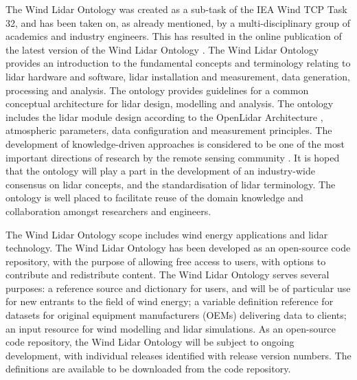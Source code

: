 \documentclass[remotesensing,article,submit,pdftex,moreauthors]{Definitions/mdpi}
\begin{document}
The Wind Lidar Ontology \cite{ref-Clifton-Costa} was created as a sub-task of the IEA Wind TCP Task 32, and has been taken on, as already mentioned, by a multi-disciplinary group of academics and industry engineers.
This has resulted in the online publication of the latest version of the Wind Lidar Ontology \cite{ref-IEA-Wind-Task-32-wind-lidar-ontology}.
The Wind Lidar Ontology provides an introduction to the fundamental concepts and terminology relating to lidar hardware and software, lidar installation and measurement, data generation, processing and analysis.
The ontology provides guidelines for a common conceptual architecture for lidar design, modelling and analysis.
The ontology includes the lidar module design according to the OpenLidar Architecture \cite{clifton_andrew_2019_3414197}, atmospheric parameters, data configuration and measurement principles.
The development of knowledge-driven approaches is considered to be one of the most important directions of research by the remote sensing community \cite{ref-Arvor_2019}.
It is hoped that the ontology will play a part in the development of an industry-wide consensus on lidar concepts, and the standardisation of lidar terminology.
The ontology is well placed to facilitate reuse of the domain knowledge and collaboration amongst researchers and engineers.

The Wind Lidar Ontology scope includes wind energy applications and lidar technology.
The Wind Lidar Ontology has been developed as an open-source code repository, with the purpose of allowing
free access to users, with options to contribute and redistribute content.
The Wind Lidar Ontology serves several purposes: a reference source and dictionary for users, and will be of particular
use for new entrants to the field of wind energy;
a variable definition reference for datasets for original equipment manufacturers (OEMs) delivering data to clients;
an input resource for wind modelling and lidar simulations.
As an open-source code repository, the Wind Lidar Ontology will be subject to ongoing development, with individual releases identified with release version numbers.
The definitions are available to be downloaded from the code repository.
\end{document}
